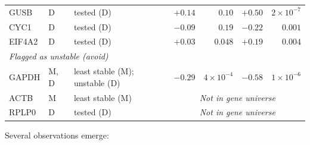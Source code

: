 \documentclass[11pt,a4paper]{article}
\begin{document}
\begin{table}[htbp]
\begin{tabular}{lllrrrr}
GUSB & D & tested (D) &
  $+0.14$ & $0.10$ &
  $+0.50$ & $2{\times}10^{-7}$ \\
CYC1 & D & tested (D) &
  $-0.09$ & $0.19$ &
  $-0.22$ & $0.001$ \\
EIF4A2 & D & tested (D) &
  $+0.03$ & $0.048$ &
  $+0.19$ & $0.004$ \\
\midrule
\multicolumn{7}{l}{\textit{Flagged as unstable (avoid)}} \\
GAPDH & M, D & least stable (M); unstable (D) &
  $-0.29$ & $4{\times}10^{-4}$ &
  $-0.58$ & $1{\times}10^{-6}$ \\
ACTB & M & least stable (M) &
  \multicolumn{4}{c}{\textit{Not in gene universe}} \\
RPLP0 & D & tested (D) &
  \multicolumn{4}{c}{\textit{Not in gene universe}} \\
\bottomrule
\end{tabular}
\end{table}

Several observations emerge:
\end{document}
